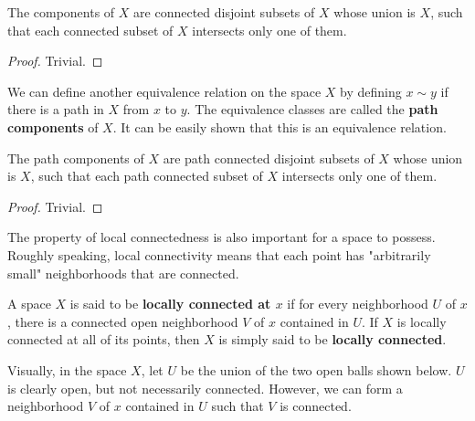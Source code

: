     \begin{theorem}
    The components of $X$ are connected disjoint subsets of $X$ whose union is $X$, such that each connected subset of $X$ intersects only one of them. 
    \end{theorem}
    \begin{proof}
    Trivial. 
    \end{proof}

    \begin{definition}
    We can define another equivalence relation on the space $X$ by defining $x \sim y$ if there is a path in $X$ from $x$ to $y$. The equivalence classes are called the \textbf{path components} of $X$. It can be easily shown that this is an equivalence relation. 
    \end{definition}

    \begin{theorem}
    The path components of $X$ are path connected disjoint subsets of $X$ whose union is $X$, such that each path connected subset of $X$ intersects only one of them. 
    \end{theorem}
    \begin{proof}
    Trivial.
    \end{proof}

    The property of local connectedness is also important for a space to possess. Roughly speaking, local connectivity means that each point has "arbitrarily small" neighborhoods that are connected. 

    \begin{definition}
    A space $X$ is said to be \textbf{locally connected at $x$} if for every neighborhood $U$ of $x$, there is a connected open neighborhood $V$ of $x$ contained in $U$. If $X$ is locally connected at all of its points, then $X$ is simply said to be \textbf{locally connected}. 
    \end{definition}
    Visually, in the space $X$, let $U$ be the union of the two open balls shown below. $U$ is clearly open, but not necessarily connected. However, we can form a  neighborhood $V$ of $x$ contained in $U$ such that $V$ is connected. 
    \begin{center}
    \end{center}

